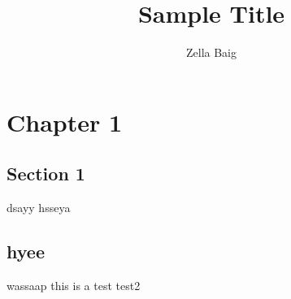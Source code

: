 \documentclass[a4paper,openany,nobib]{tufte-book}
\title{Sample Title}
\author{Zella Baig}
\begin{document}
\frontmatter
{\maketitle}
\tableofcontents
\thispagestyle{empty}
\mainmatter
\chapter{Chapter 1}%
\setcounter{page}{1}
\label{cha:Hello}
\section{Section 1}%
\label{sec:Section 1}
dsayy
hsseya\autocite{westfall}
\section{hyee}%
\label{sec:hyee}
\newpage
wassaap
\newpage
this is a test
\newpage 
test2
\nocite{*}
\printbibliography
\end{document}
